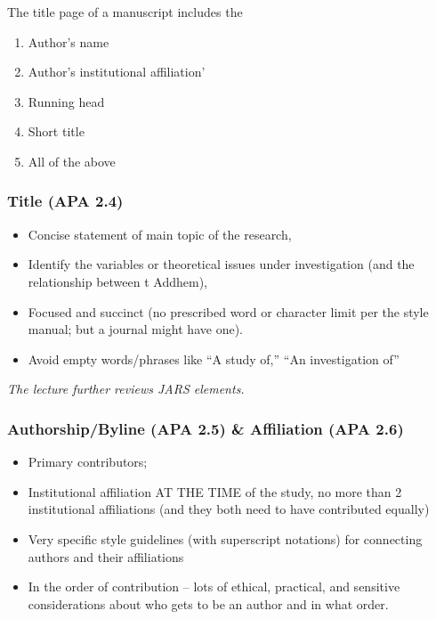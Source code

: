 \documentclass[
  11pt,
]{book}
\providecommand{\tightlist}{%
  \setlength{\itemsep}{0pt}\setlength{\parskip}{0pt}}
\begin{document}
The title page of a manuscript includes the

\begin{enumerate}
\def\labelenumi{\alph{enumi}.}
\tightlist
\item
  Author's name
\item
  Author's institutional affiliation'
\item
  Running head
\item
  Short title
\item
  All of the above
\end{enumerate}

\hypertarget{title-apa-2.4}{%
\subsubsection{Title (APA 2.4)}\label{title-apa-2.4}}

\begin{itemize}
\tightlist
\item
  Concise statement of main topic of the research,
\item
  Identify the variables or theoretical issues under investigation (and the relationship between t Addhem),
\item
  Focused and succinct (no prescribed word or character limit per the style manual; but a journal might have one).
\item
  Avoid empty words/phrases like ``A study of,'' ``An investigation of''
\end{itemize}

\emph{The lecture further reviews JARS elements.}

\hypertarget{authorshipbyline-apa-2.5-affiliation-apa-2.6}{%
\subsubsection{Authorship/Byline (APA 2.5) \& Affiliation (APA 2.6)}\label{authorshipbyline-apa-2.5-affiliation-apa-2.6}}

\begin{itemize}
\tightlist
\item
  Primary contributors;
\item
  Institutional affiliation AT THE TIME of the study, no more than 2 institutional affiliations (and they both need to have contributed equally)
\item
  Very specific style guidelines (with superscript notations) for connecting authors and their affiliations
\item
  In the order of contribution -- lots of ethical, practical, and sensitive considerations about who gets to be an author and in what order.
\end{itemize}
\end{document}
